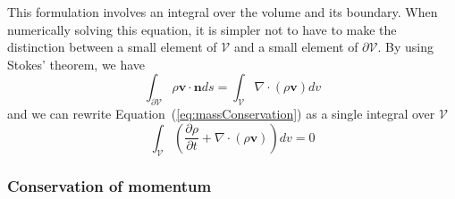 This formulation involves an integral over the volume and its boundary.
When numerically solving this equation, it is simpler not to have to make the distinction between a small element of $\mathcal{V}$ and a small element of $\partial \mathcal{V}$.
By using Stokes' theorem, we have
\begin{equation}
\displaystyle 
\int_{\partial \mathcal{V}} \rho \mathbf{v} \cdot \mathbf{n} ds =
\int_{\mathcal{V}} \nabla \cdot \left( \rho \mathbf{v} \right) dv
\end{equation}
and we can rewrite Equation~(\ref{eq:massConservation}) as a single integral over $\mathcal{V}$
\begin{equation}
\label{eq:volumetricMassConservation}
\displaystyle 
\int_{\mathcal{V}} 
\left( \frac{\partial \rho}{\partial t} + \nabla \cdot \left( \rho  \mathbf{v} \right) \right) dv = 0
\end{equation}

\subsubsection{Conservation of momentum}

